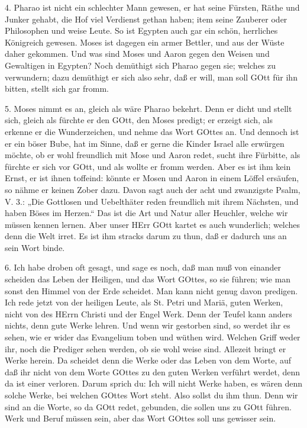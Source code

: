 4. Pharao ist nicht ein schlechter Mann gewesen, er hat seine Fürsten, Räthe und Junker gehabt, die Hof viel Verdienst gethan haben; item seine Zauberer oder Philosophen und weise Leute. So ist Egypten auch gar ein schön, herrliches Königreich gewesen. Moses ist dagegen ein armer Bettler, und aus der Wüste daher gekommen. Und was sind Moses und Aaron gegen den Weisen und Gewaltigen in Egypten? Noch demüthigt sich Pharao gegen sie; welches zu verwundern; dazu demüthigt er sich also sehr, daß er will, man soll GOtt für ihn bitten, stellt sich gar fromm.

5. Moses nimmt es an, gleich als wäre Pharao bekehrt. Denn er dicht und stellt sich, gleich als fürchte er den GOtt, den Moses predigt; er erzeigt sich, als erkenne er die Wunderzeichen, und nehme das Wort GOttes an. Und dennoch ist er ein böser Bube, hat im Sinne, daß er gerne die Kinder Israel alle erwürgen möchte, ob er wohl freundlich mit Mose und Aaron redet, sucht ihre Fürbitte, als fürchte er sich vor GOtt, und als wollte er fromm werden. Aber es ist ihm kein Ernst, er ist ihnen toffeind: könnte er Mosen und Aaron in einem Löffel ersäufen, so nähme er keinen Zober dazu. Davon sagt auch der acht und zwanzigste Psalm, V. 3.: „Die Gottlosen und Uebelthäter reden freundlich mit ihrem Nächsten, und haben Böses im Herzen.“ Das ist die Art und Natur aller Heuchler, welche wir müssen kennen lernen. Aber unser HErr GOtt kartet es auch wunderlich; welches denn die Welt irret. Es ist ihm stracks darum zu thun, daß er dadurch uns an sein Wort binde.

6. Ich habe droben oft gesagt, und sage es
noch, daß man muß von einander scheiden das Leben der Heiligen, und das Wort GOttes, so sie führen; wie man sonst den Himmel von der Erde scheidet. Man kann nicht genug davon predigen. Ich rede jetzt von der heiligen Leute, als St. Petri und Mariä, guten Werken, nicht von des HErrn Christi und der Engel Werk. Denn der Teufel kann anders nichts, denn gute Werke lehren. Und wenn wir gestorben sind, so werdet ihr es sehen, wie er wider das Evangelium toben und wüthen wird. Welchen Griff weder ihr, noch die Prediger sehen werden, ob sie wohl weise sind. Allezeit bringt er Werke herein. Da scheidet denn die Werke oder das Leben von dem Worte, auf daß ihr nicht von dem Worte GOttes zu den guten Werken verführt werdet, denn da ist einer verloren. Darum sprich du: Ich will nicht Werke haben, es wären denn solche Werke, bei welchen GOttes Wort steht. Also sollst du ihm thun. Denn wir sind an die Worte, so da GOtt redet, gebunden, die sollen uns zu GOtt führen. Werk und Beruf müssen sein, aber das Wort GOttes soll uns gewisser sein.

